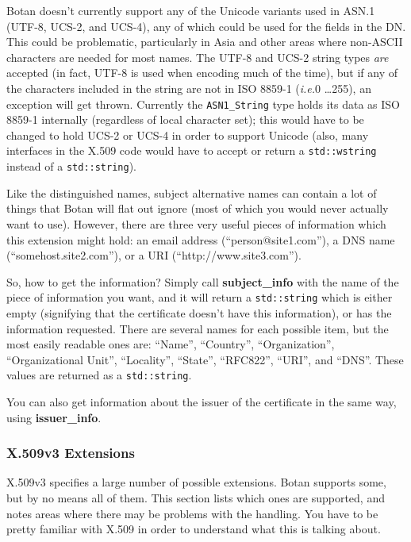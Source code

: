 \documentclass{article}
\newcommand{\function}[1]{\textbf{#1}}
\newcommand{\type}[1]{\texttt{#1}}
\newcommand{\ie}[0]{\emph{i.e.}}
\begin{document}
Botan doesn't currently support any of the Unicode variants used in ASN.1
(UTF-8, UCS-2, and UCS-4), any of which could be used for the fields in the
DN. This could be problematic, particularly in Asia and other areas where
non-ASCII characters are needed for most names. The UTF-8 and UCS-2 string
types \emph{are} accepted (in fact, UTF-8 is used when encoding much of the
time), but if any of the characters included in the string are not in ISO
8859-1 (\ie 0 \ldots 255), an exception will get thrown. Currently the
\type{ASN1\_String} type holds its data as ISO 8859-1 internally (regardless
of local character set); this would have to be changed to hold UCS-2 or UCS-4
in order to support Unicode (also, many interfaces in the X.509 code would have
to accept or return a \type{std::wstring} instead of a \type{std::string}).

Like the distinguished names, subject alternative names can contain a lot of
things that Botan will flat out ignore (most of which you would never actually
want to use). However, there are three very useful pieces of information which
this extension might hold: an email address (``person@site1.com''), a DNS name
(``somehost.site2.com''), or a URI (``http://www.site3.com'').

So, how to get the information? Simply call \function{subject\_info} with the
name of the piece of information you want, and it will return a
\type{std::string} which is either empty (signifying that the certificate
doesn't have this information), or has the information requested. There are
several names for each possible item, but the most easily readable ones are:
``Name'', ``Country'', ``Organization'', ``Organizational Unit'', ``Locality'',
``State'', ``RFC822'', ``URI'', and ``DNS''. These values are returned as a
\type{std::string}.

You can also get information about the issuer of the certificate in the same
way, using \function{issuer\_info}.

\subsubsection{X.509v3 Extensions}

X.509v3 specifies a large number of possible extensions. Botan supports some,
but by no means all of them. This section lists which ones are supported, and
notes areas where there may be problems with the handling. You have to be
pretty familiar with X.509 in order to understand what this is talking about.
\end{document}
